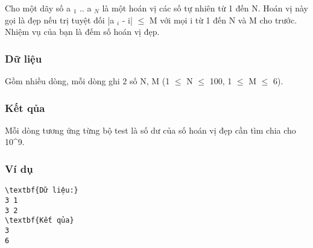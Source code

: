 



   Cho một dãy số a   $_    1   $   .. a   $_    N   $   là một hoán vị các số tự nhiên từ 1 đến N. Hoán vị này gọi là đẹp nếu trị tuyệt đối |a   $_    i   $   - i|  $\le$  M với mọi i từ 1 đến N và M cho trước. Nhiệm vụ của bạn là đếm số hoán vị đẹp.  

\subsubsection{   Dữ liệu  }

   Gồm nhiều dòng, mỗi dòng ghi 2 số N, M (1 $\le$  N  $\le$  100, 1  $\le$  M  $\le$  6).  

\subsubsection{   Kết qủa  }

   Mỗi dòng tương ứng từng bộ test là số dư  của số hoán vị đẹp cần tìm chia cho 10^9.  

\subsubsection{   Ví dụ  }
\begin{verbatim}
\textbf{Dữ liệu:} 
3 1
3 2
\textbf{Kết qủa} 
3
6
\end{verbatim}
